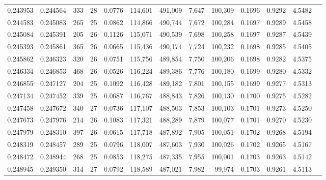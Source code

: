 \begin{tabular}{rrrrrrrrrrrrr}
0.243953 & 0.244564 &   333 &  28 &                                     0.0776 & 114,601 & 491,009 &   7,647 & 100,309 & 0.1696 & 0.9292 & 4.5482 \\
0.244583 & 0.245083 &   265 &  25 &                                     0.0862 & 114,866 & 490,744 &   7,672 & 100,284 & 0.1697 & 0.9289 & 4.5458 \\
0.245084 & 0.245391 &   205 &  26 &                                     0.1126 & 115,071 & 490,539 &   7,698 & 100,258 & 0.1697 & 0.9287 & 4.5439 \\
0.245393 & 0.245861 &   365 &  26 &                                     0.0665 & 115,436 & 490,174 &   7,724 & 100,232 & 0.1698 & 0.9285 & 4.5405 \\
0.245862 & 0.246323 &   320 &  26 &                                     0.0751 & 115,756 & 489,854 &   7,750 & 100,206 & 0.1698 & 0.9282 & 4.5375 \\
0.246334 & 0.246853 &   468 &  26 &                                     0.0526 & 116,224 & 489,386 &   7,776 & 100,180 & 0.1699 & 0.9280 & 4.5332 \\
0.246855 & 0.247127 &   204 &  25 &                                     0.1092 & 116,428 & 489,182 &   7,801 & 100,155 & 0.1699 & 0.9277 & 4.5313 \\
0.247134 & 0.247452 &   339 &  25 &                                     0.0687 & 116,767 & 488,843 &   7,826 & 100,130 & 0.1700 & 0.9275 & 4.5282 \\
0.247458 & 0.247672 &   340 &  27 &                                     0.0736 & 117,107 & 488,503 &   7,853 & 100,103 & 0.1701 & 0.9273 & 4.5250 \\
0.247673 & 0.247976 &   214 &  26 &                                     0.1083 & 117,321 & 488,289 &   7,879 & 100,077 & 0.1701 & 0.9270 & 4.5230 \\
0.247979 & 0.248310 &   397 &  26 &                                     0.0615 & 117,718 & 487,892 &   7,905 & 100,051 & 0.1702 & 0.9268 & 4.5194 \\
0.248319 & 0.248457 &   289 &  25 &                                     0.0796 & 118,007 & 487,603 &   7,930 & 100,026 & 0.1702 & 0.9265 & 4.5167 \\
0.248472 & 0.248944 &   268 &  25 &                                     0.0853 & 118,275 & 487,335 &   7,955 & 100,001 & 0.1703 & 0.9263 & 4.5142 \\
0.248945 & 0.249350 &   314 &  27 &                                     0.0792 & 118,589 & 487,021 &   7,982 &  99,974 & 0.1703 & 0.9261 & 4.5113 \\

\end{tabular}
